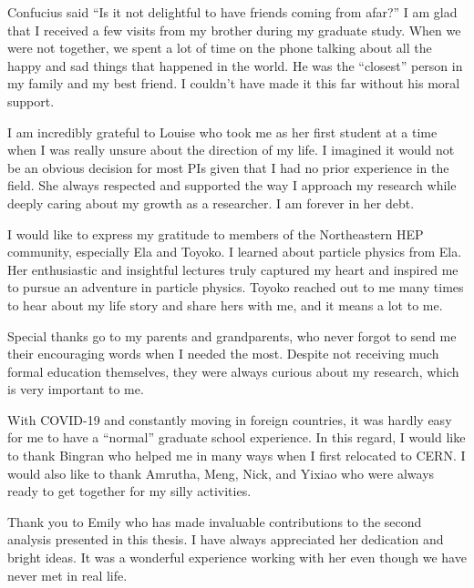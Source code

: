 \begin{acknowledgments}

Confucius said ``Is it not delightful to have friends coming from afar?'' I am glad that I received a few visits from my brother during my graduate study. When we were not together, we spent a lot of time on the phone talking about all the happy and sad things that happened in the world. He was the ``closest'' person in my family and my best friend. I couldn’t have made it this far without his moral support.

I am incredibly grateful to Louise who took me as her first student at a time when I was really unsure about the direction of my life. I imagined it would not be an obvious decision for most PIs given that I had no prior experience in the field. She always respected and supported the way I approach my research while deeply caring about my growth as a researcher. I am forever in her debt.  

I would like to express my gratitude to members of the Northeastern HEP community, especially Ela and Toyoko. I learned about particle physics from Ela. Her enthusiastic and insightful lectures truly captured my heart and inspired me to pursue an adventure in particle physics. Toyoko reached out to me many times to hear about my life story and share hers with me, and it means a lot to me.

Special thanks go to my parents and grandparents, who never forgot to send me their encouraging words when I needed the most. Despite not receiving much formal education themselves, they were always curious about my research, which is very important to me.

With COVID-19 and constantly moving in foreign countries, it was hardly easy for me to have a ``normal'' graduate school experience. In this regard, I would like to thank Bingran who helped me in many ways when I first relocated to CERN. I would also like to thank Amrutha, Meng, Nick, and Yixiao who were always ready to get together for my silly activities. 

Thank you to Emily who has made invaluable contributions to the second analysis presented in this thesis. I have always appreciated her dedication and bright ideas. It was a wonderful experience working with her even though we have never met in real life.

\end{acknowledgments}